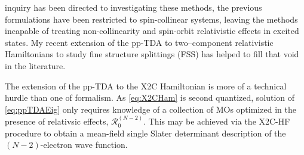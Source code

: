 inquiry has been directed to investigating these methods, the previous
formulations have been restricted to spin-collinear systems, leaving the methods
incapable of treating non-collinearity and spin-orbit relativistic effects in
excited states.  My recent extension of the pp-TDA to two--component
relativistic Hamiltonians\cite{DBWY16_Accepted1} to study fine structure
splittings (FSS) has helped to fill that void in the literature.


The extension of the pp-TDA to the X2C Hamiltonian is more of a technical hurdle
than one of formalism. As \cref{eq:X2CHam} is second quantized, solution of
\cref{eq:ppTDAEig} only requires knowledge of a collection of MOs optimized in
the presence of relativsic effects,
$\mathcal{R}_0^{(N-2)}$. This may be achieved via the X2C-HF procedure to obtain
a mean-field single Slater determinant description of the $(N-2)$-electron wave
function.

